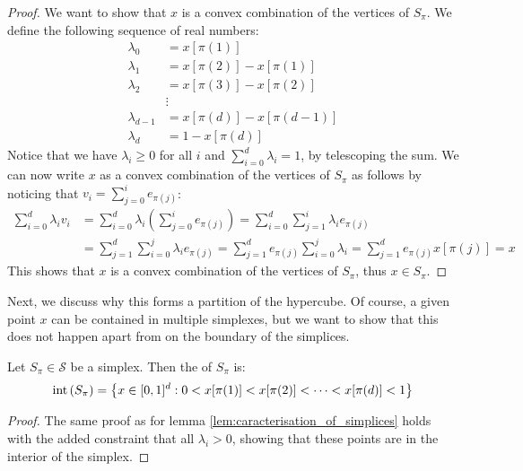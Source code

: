 \begin{proof}
	We want to show that $x$ is a convex combination of the vertices of $S_{\pi}$. We define the following sequence of real numbers:
	\begin{align*}
		\lambda_0     & = x[\pi(1)]               \\
		\lambda_1     & = x[\pi(2)] - x[\pi(1)]   \\
		\lambda_2     & = x[\pi(3)] - x[\pi(2)]   \\
		              & \vdots                    \\
		\lambda_{d-1} & = x[\pi(d)] - x[\pi(d-1)] \\
		\lambda_d     & = 1 - x[\pi(d)]
	\end{align*}
	Notice that we have $\lambda_i \geq 0$ for all $i$ and $\sum_{i=0}^{d} \lambda_i = 1$, by telescoping the sum. We can now write $x$ as a convex combination of the vertices of $S_{\pi}$ as follows by noticing that $v_i = \sum_{j=0}^{i} e_{\pi(j)}$:
	\begin{align*}
		\sum_{i=0}^{d} \lambda_i v_i & = \sum_{i=0}^{d} \lambda_i \left( \sum_{j=0}^{i} e_{\pi(j)} \right)  = \sum_{i=0}^{d} \sum_{j=1}^{i} \lambda_i e_{\pi(j)}                                             \\
		                             & = \sum_{j=1}^{d} \sum_{i=0}^{j} \lambda_i e_{\pi(j)}  = \sum_{j=1}^{d} e_{\pi(j)} \sum_{i=0}^{j} \lambda_i        = \sum_{j=1}^{d} e_{\pi(j)} x[\pi(j)]           = x
	\end{align*}
	This shows that $x$ is a convex combination of the vertices of $S_{\pi}$, thus $x \in S_{\pi}$.
\end{proof}
Next, we discuss why this forms a partition of the hypercube. Of course, a given point $x$ can be contained in multiple simplexes, but we want to show that this does not happen apart from on the boundary of the simplices.
\begin{lemma}
	Let $S_{\pi} \in \mathcal{S}$ be a simplex. Then the  of $S_{\pi}$ is:
	\begin{align*}
		\text{int}\left(S_{\pi}\right) = \left\{x \in [0, 1]^d : 0 < x[\pi(1)] < x[\pi(2)] < \dots < x[\pi(d)] < 1\right\}
	\end{align*}
\end{lemma}
\begin{proof}
	The same proof as for lemma \ref{lem:caracterisation_of_simplices} holds with the added constraint that all $\lambda_i > 0$, showing that these points are in the interior of the simplex.
\end{proof}
